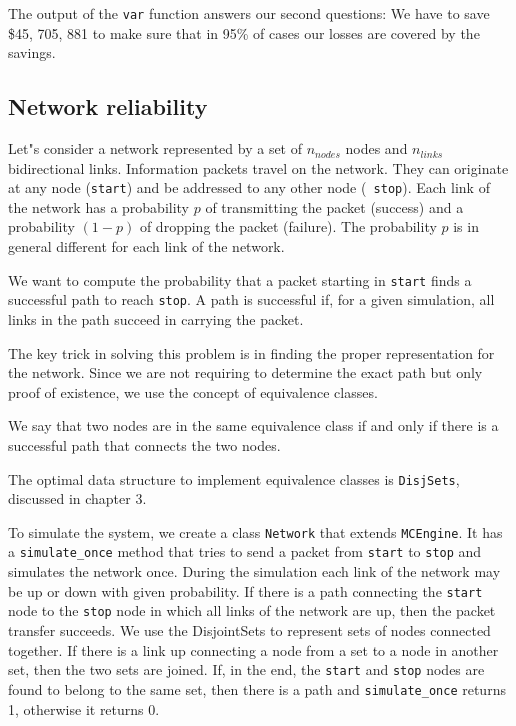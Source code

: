 \documentclass[justified, sixbynine]{tufte-book}
\def\ft{\small\tt}
\theoremstyle{plain}%
\newtheorem * {corollary}{Corollary}
\theoremstyle{definition}
\theoremstyle{remark}
\newtheorem * {remark}{Remark}
\newtheorem * {note}{Note}
\begin{document}
\begin{fullwidth}
The output of the {\ft var} function answers our second questions: We have to save \$45, 705, 881 to make sure that in 95\% of cases our losses are covered by the savings.


\subsection{Network reliability}

Let"s consider a network represented by a set of $n_{nodes}$ nodes and $%
n_{links}$ bidirectional links. Information
packets travel on the network. They can
originate at any node ({\ft start}) and be addressed to any other node ({\ft %
stop}). Each link of the network has a probability $p$ of transmitting the
packet (success) and a probability $(1-p)$ of dropping the packet (failure).
The probability $p$ is in general different for each link of the network.

We want to compute the probability that a packet
starting in {\ft start} finds a successful path to reach {\ft stop}. A path
is successful if, for a given simulation, all links in the path succeed in
carrying the packet.

The key trick in solving this problem is in finding the proper
representation for the network. Since we are not requiring to determine the
exact path but only proof of existence, we use the concept of equivalence classes.

We say that two nodes are in the same equivalence class if and only
if there is a successful path that connects the two nodes.

The optimal data structure to implement equivalence classes is {\ft DisjSets}, discussed in chapter 3.

To simulate the system, we create a class {\ft Network} that extends {\ft MCEngine}. It has a {\ft simulate\_once} method that tries to send a packet from {\ft start} to
{\ft stop} and simulates the network once. During the simulation each link of the network may be up or down with given probability. If there is a path connecting the {\ft start} node to the {\ft stop} node in which all links of the network are up, then the packet transfer succeeds. We use the DisjointSets to represent sets of nodes connected together. If there is a link up connecting a node from a set to a node in another set, then the two sets are joined. If, in the end, the {\ft start} and {\ft stop} nodes are found to belong to the same set, then there is a path and {\ft simulate\_once} returns 1, otherwise it returns 0.


\end{fullwidth}
\end{document}
